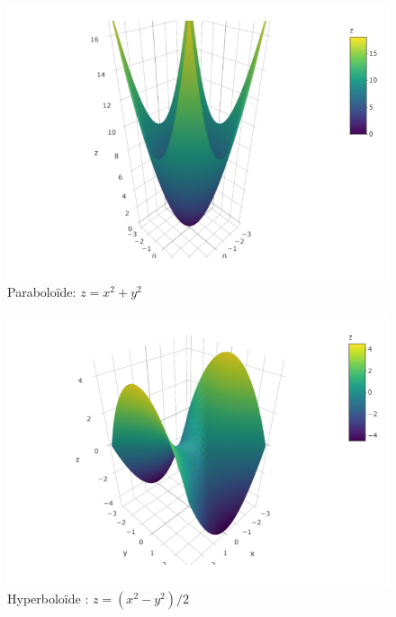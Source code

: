 \documentclass[]{book}
\theoremstyle{definition}
\theoremstyle{definition}
\theoremstyle{definition}
\theoremstyle{remark}
\begin{document}
\begin{figure}

{\centering \includegraphics[width=0.8\linewidth]{resources/images/paraboloide} 

}

\caption{Paraboloïde: $z=x^2+y^2$}\label{fig:paraboloide}
\end{figure}

\begin{figure}

{\centering \includegraphics[width=0.8\linewidth]{resources/images/hyperboloide} 

}

\caption{Hyperboloïde : $z=(x^2-y^2)/2$}\label{fig:hyperboloide}
\end{figure}
\end{document}
